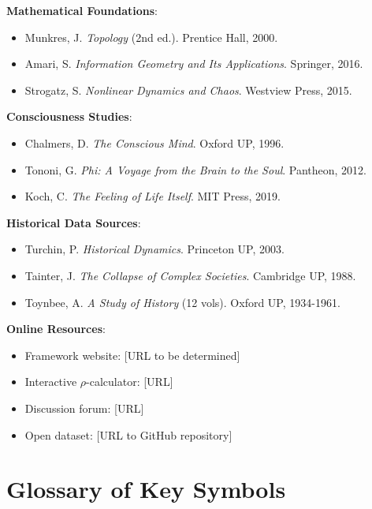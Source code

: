 \documentclass[11pt,a4paper]{article}
\theoremstyle{definition}
\theoremstyle{remark}
\begin{document}
\begin{small}
\begin{enumerate}
\begin{protocol}
\textbf{Mathematical Foundations}:
\begin{itemize}
    \item Munkres, J. \textit{Topology} (2nd ed.). Prentice Hall, 2000.
    \item Amari, S. \textit{Information Geometry and Its Applications}. Springer, 2016.
    \item Strogatz, S. \textit{Nonlinear Dynamics and Chaos}. Westview Press, 2015.
\end{itemize}

\textbf{Consciousness Studies}:
\begin{itemize}
    \item Chalmers, D. \textit{The Conscious Mind}. Oxford UP, 1996.
    \item Tononi, G. \textit{Phi: A Voyage from the Brain to the Soul}. Pantheon, 2012.
    \item Koch, C. \textit{The Feeling of Life Itself}. MIT Press, 2019.
\end{itemize}

\textbf{Historical Data Sources}:
\begin{itemize}
    \item Turchin, P. \textit{Historical Dynamics}. Princeton UP, 2003.
    \item Tainter, J. \textit{The Collapse of Complex Societies}. Cambridge UP, 1988.
    \item Toynbee, A. \textit{A Study of History} (12 vols). Oxford UP, 1934-1961.
\end{itemize}

\textbf{Online Resources}:
\begin{itemize}
    \item Framework website: [URL to be determined]
    \item Interactive \(\rho\)-calculator: [URL]
    \item Discussion forum: [URL]
    \item Open dataset: [URL to GitHub repository]
\end{itemize}

\vspace{2em}

\section*{Glossary of Key Symbols}


\end{protocol}
\end{enumerate}
\end{small}
\end{document}
